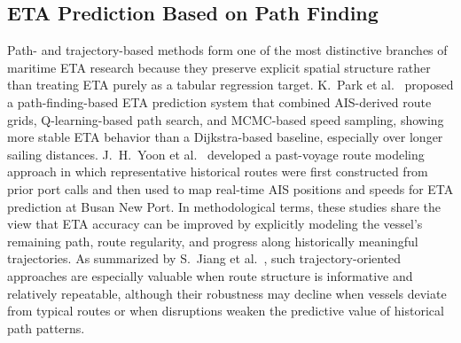 \documentclass[conference]{IEEEtran}
\begin{document}
\subsection{ETA Prediction Based on Path Finding}
Path- and trajectory-based methods form one of the most distinctive branches of maritime ETA research because they preserve explicit spatial structure rather than treating ETA purely as a tabular regression target. K.~Park et al.~\cite{parkVesselEstimatedTime2021} proposed a path-finding-based ETA prediction system that combined AIS-derived route grids, Q-learning-based path search, and MCMC-based speed sampling, showing more stable ETA behavior than a Dijkstra-based baseline, especially over longer sailing distances. J.~H.~Yoon et al.~\cite{yoonEnhancingContainerVessel2023} developed a past-voyage route modeling approach in which representative historical routes were first constructed from prior port calls and then used to map real-time AIS positions and speeds for ETA prediction at Busan New Port. In methodological terms, these studies share the view that ETA accuracy can be improved by explicitly modeling the vessel’s remaining path, route regularity, and progress along historically meaningful trajectories. As summarized by S.~Jiang et al.~\cite{jiangPredictionVesselArrival2025}, such trajectory-oriented approaches are especially valuable when route structure is informative and relatively repeatable, although their robustness may decline when vessels deviate from typical routes or when disruptions weaken the predictive value of historical path patterns.
\end{document}
